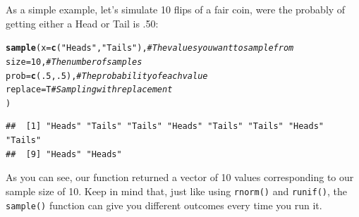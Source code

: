 \documentclass{tufte-book}\usepackage[]{graphicx}\usepackage[]{color}
\makeatletter
\newcommand{\hlnum}[1]{\textcolor[rgb]{0.686,0.059,0.569}{#1}}%
\newcommand{\hlstr}[1]{\textcolor[rgb]{0.192,0.494,0.8}{#1}}%
\newcommand{\hlcom}[1]{\textcolor[rgb]{0.678,0.584,0.686}{\textit{#1}}}%
\newcommand{\hlstd}[1]{\textcolor[rgb]{0.345,0.345,0.345}{#1}}%
\newcommand{\hlkwc}[1]{\textcolor[rgb]{0.333,0.667,0.333}{#1}}%
\newcommand{\hlkwd}[1]{\textcolor[rgb]{0.737,0.353,0.396}{\textbf{#1}}}%
\newenvironment{kframe}{%
 \def\at@end@of@kframe{}%
 \ifinner\ifhmode%
  \def\at@end@of@kframe{\end{minipage}}%
  \begin{minipage}{\columnwidth}%
 \fi\fi%
 \def\FrameCommand##1{\hskip\@totalleftmargin \hskip-\fboxsep
 \colorbox{shadecolor}{##1}\hskip-\fboxsep
     \hskip-\linewidth \hskip-\@totalleftmargin \hskip\columnwidth}%
 \MakeFramed {\advance\hsize-\width
   \@totalleftmargin\z@ \linewidth\hsize
   \@setminipage}}%
 {\par\unskip\endMakeFramed%
 \at@end@of@kframe}
\newenvironment{knitrout}{}{} %
\makeatother
\begin{document}
As a simple example, let's simulate 10 flips of a fair coin, were the probably of getting either a Head or Tail is .50:

\begin{footnotesize}
\begin{knitrout}
\color{fgcolor}\begin{kframe}
\begin{alltt}
\hlkwd{sample}\hlstd{(}\hlkwc{x} \hlstd{=} \hlkwd{c}\hlstd{(}\hlstr{"Heads"}\hlstd{,} \hlstr{"Tails"}\hlstd{),} \hlcom{# The values you want to sample from}
       \hlkwc{size} \hlstd{=} \hlnum{10}\hlstd{,}  \hlcom{# The number of samples}
       \hlkwc{prob} \hlstd{=} \hlkwd{c}\hlstd{(}\hlnum{.5}\hlstd{,} \hlnum{.5}\hlstd{),} \hlcom{# The probability of each value}
       \hlkwc{replace} \hlstd{= T} \hlcom{# Sampling with replacement}
       \hlstd{)}
\end{alltt}
\begin{verbatim}
##  [1] "Heads" "Tails" "Tails" "Heads" "Tails" "Tails" "Heads" "Tails"
##  [9] "Heads" "Heads"
\end{verbatim}
\end{kframe}
\end{knitrout}
\end{footnotesize}

As you can see, our function returned a vector of 10 values corresponding to our sample size of 10. Keep in mind that, just like using \texttt{rnorm()} and \texttt{runif()}, the \texttt{sample()} function can give you different outcomes every time you run it.
\end{document}
